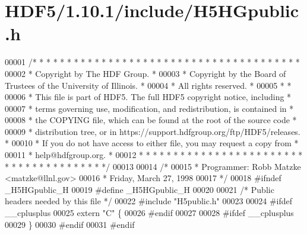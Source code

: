 \hypertarget{_h_d_f5_21_810_81_2include_2_h5_h_gpublic_8h_source}{}\section{H\+D\+F5/1.10.1/include/\+H5\+H\+Gpublic.h}
\label{_h_d_f5_21_810_81_2include_2_h5_h_gpublic_8h_source}

\begin{DoxyCode}
00001 \textcolor{comment}{/* * * * * * * * * * * * * * * * * * * * * * * * * * * * * * * * * * * * * * *}
00002 \textcolor{comment}{ * Copyright by The HDF Group.                                               *}
00003 \textcolor{comment}{ * Copyright by the Board of Trustees of the University of Illinois.         *}
00004 \textcolor{comment}{ * All rights reserved.                                                      *}
00005 \textcolor{comment}{ *                                                                           *}
00006 \textcolor{comment}{ * This file is part of HDF5.  The full HDF5 copyright notice, including     *}
00007 \textcolor{comment}{ * terms governing use, modification, and redistribution, is contained in    *}
00008 \textcolor{comment}{ * the COPYING file, which can be found at the root of the source code       *}
00009 \textcolor{comment}{ * distribution tree, or in https://support.hdfgroup.org/ftp/HDF5/releases.  *}
00010 \textcolor{comment}{ * If you do not have access to either file, you may request a copy from     *}
00011 \textcolor{comment}{ * help@hdfgroup.org.                                                        *}
00012 \textcolor{comment}{ * * * * * * * * * * * * * * * * * * * * * * * * * * * * * * * * * * * * * * */}
00013 
00014 \textcolor{comment}{/*}
00015 \textcolor{comment}{ * Programmer:  Robb Matzke <matzke@llnl.gov>}
00016 \textcolor{comment}{ *              Friday, March 27, 1998}
00017 \textcolor{comment}{ */}
00018 \textcolor{preprocessor}{#ifndef \_H5HGpublic\_H}
00019 \textcolor{preprocessor}{#define \_H5HGpublic\_H}
00020 
00021 \textcolor{comment}{/* Public headers needed by this file */}
00022 \textcolor{preprocessor}{#include "H5public.h"}
00023 
00024 \textcolor{preprocessor}{#ifdef \_\_cplusplus}
00025 \textcolor{keyword}{extern} \textcolor{stringliteral}{"C"} \{
00026 \textcolor{preprocessor}{#endif}
00027 
00028 \textcolor{preprocessor}{#ifdef \_\_cplusplus}
00029 \}
00030 \textcolor{preprocessor}{#endif}
00031 \textcolor{preprocessor}{#endif}
\end{DoxyCode}
